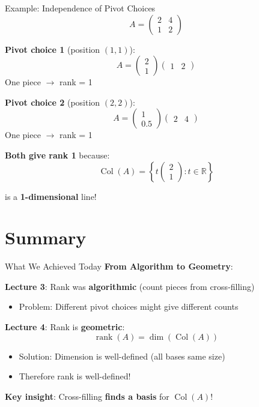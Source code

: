 \documentclass[10pt]{beamer}
\theoremstyle{definition}
\newcommand{\x}[1]{\alert{\textbf{#1}}}
\begin{document}
\begin{frame}{Example: Independence of Pivot Choices}
$$A = \begin{pmatrix} 2 & 4 \\ 1 & 2 \end{pmatrix}$$

\vfill
\x{Pivot choice 1} (position $(1,1)$):
$$A = \begin{pmatrix} 2 \\ 1 \end{pmatrix}\begin{pmatrix} 1 & 2 \end{pmatrix}$$
One piece $\to$ rank = 1

\vfill
\x{Pivot choice 2} (position $(2,2)$):
$$A = \begin{pmatrix} 1 \\ 0.5 \end{pmatrix}\begin{pmatrix} 2 & 4 \end{pmatrix}$$
One piece $\to$ rank = 1

\vfill
\x{Both give rank 1} because:
$$\operatorname{Col}(A) = \left\{ t\begin{pmatrix} 2 \\ 1 \end{pmatrix} : t \in \mathbb{R} \right\}$$

is a \x{1-dimensional} line!
\end{frame}

\section{Summary}

\begin{frame}{What We Achieved Today}
\x{From Algorithm to Geometry}:

\vfill
\textbf{Lecture 3}: Rank was \x{algorithmic} (count pieces from cross-filling)
\begin{itemize}
\item Problem: Different pivot choices might give different counts
\end{itemize}

\vfill
\textbf{Lecture 4}: Rank is \x{geometric}:
$$\boxed{\operatorname{rank}(A) = \dim(\operatorname{Col}(A))}$$

\begin{itemize}
\item Solution: Dimension is well-defined (all bases same size)
\item Therefore rank is well-defined!
\end{itemize}

\vfill
\x{Key insight}: Cross-filling \x{finds a basis} for $\operatorname{Col}(A)$!
\end{frame}
\end{document}
